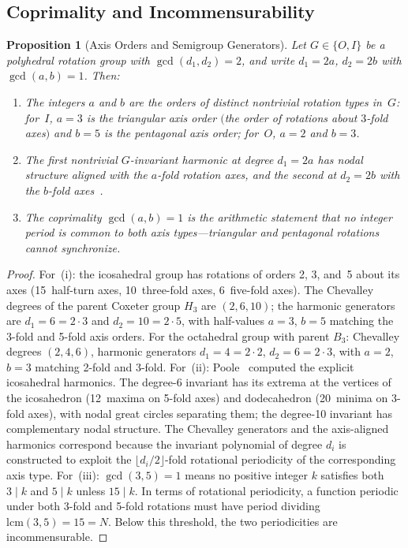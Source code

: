 \documentclass[11pt,letterpaper]{article}
\newtheorem{proposition}[theorem]{Proposition}
\theoremstyle{definition}
\begin{document}
\subsection{Coprimality and Incommensurability}\label{sec:coprime}
\begin{proposition}[Axis Orders and Semigroup Generators]\label{prop:coprime}
Let $G\in\{O,I\}$ be a polyhedral rotation group with $\gcd(d_1,d_2)=2$, and write $d_1=2a$, $d_2=2b$ with $\gcd(a,b)=1$.  Then:
\begin{enumerate}[label=\textup{(\roman*)}]
  \item The integers $a$ and $b$ are the orders of distinct nontrivial rotation types in~$G$: for~$I$, $a=3$ is the triangular axis order $($the order of rotations about $3$-fold axes$)$ and $b=5$ is the pentagonal axis order; for~$O$, $a=2$ and $b=3$.
  \item The first nontrivial $G$-invariant harmonic at degree $d_1=2a$ has nodal structure aligned with the $a$-fold rotation axes, and the second at $d_2=2b$ with the $b$-fold axes~\cite{Poole1932}.
  \item The coprimality $\gcd(a,b)=1$ is the arithmetic statement that no integer period is common to both axis types---triangular and pentagonal rotations cannot synchronize.
\end{enumerate}
\end{proposition}
\begin{proof}
For~(i): the icosahedral group has rotations of orders 2, 3, and~5 about its axes (15~half-turn axes, 10~three-fold axes, 6~five-fold axes).  The Chevalley degrees of the parent Coxeter group $H_3$ are $(2,6,10)$; the harmonic generators are $d_1=6=2\cdot3$ and $d_2=10=2\cdot5$, with half-values $a=3$, $b=5$ matching the 3-fold and 5-fold axis orders.  For the octahedral group with parent $B_3$: Chevalley degrees $(2,4,6)$, harmonic generators $d_1=4=2\cdot2$, $d_2=6=2\cdot3$, with $a=2$, $b=3$ matching 2-fold and 3-fold.
For~(ii): Poole~\cite{Poole1932} computed the explicit icosahedral harmonics.  The degree-6 invariant has its extrema at the vertices of the icosahedron (12~maxima on 5-fold axes) and dodecahedron (20~minima on 3-fold axes), with nodal great circles separating them; the degree-10 invariant has complementary nodal structure.  The Chevalley generators and the axis-aligned harmonics correspond because the invariant polynomial of degree $d_i$ is constructed to exploit the $\lfloor d_i/2\rfloor$-fold rotational periodicity of the corresponding axis type.
For~(iii): $\gcd(3,5)=1$ means no positive integer $k$ satisfies both $3\mid k$ and $5\mid k$ unless $15\mid k$.  In terms of rotational periodicity, a function periodic under both 3-fold and 5-fold rotations must have period dividing $\mathrm{lcm}(3,5)=15=N$.  Below this threshold, the two periodicities are incommensurable.
\end{proof}
\end{document}
